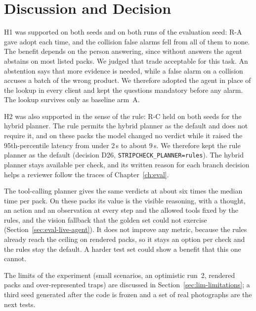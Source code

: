 \section{Discussion and Decision}
\label{sec:exp-discussion-and-decision}

H1 was supported on both seeds and on both runs of the evaluation seed: R-A gave adopt each time, and
the collision false alarms fell from all of them to none. The benefit depends on the person
answering, since without answers the agent abstains on most listed packs. We judged that trade
acceptable for this task. An abstention says that more evidence is needed, while a false alarm on a
collision accuses a batch of the wrong product. We therefore adopted the agent in place of the lookup
in every client and kept the questions mandatory before any alarm. The lookup survives only as
baseline arm~A.

H2 was also supported in the sense of the rule: R-C held on both seeds for the hybrid planner. The rule permits the hybrid
planner as the default and does not require it, and on these packs the model changed no verdict
while it raised the 95th-percentile latency from under 2\,s to about 9\,s. We therefore kept the rule
planner as the default (decision D26, \texttt{STRIPCHECK\_PLANNER=rules}). The hybrid planner stays
available per check, and its written reason for each branch decision helps a reviewer follow the
traces of Chapter~\ref{ch:eval}.

The tool-calling planner gives the same verdicts at about six times the median time per pack. On these packs its value is
the visible reasoning, with a thought, an action and an observation at every step and the allowed tools fixed by the rules, and
the vision fallback that the golden set could not exercise (Section~\ref{sec:eval-live-agent}). It does not improve any metric,
because the rules already reach the ceiling on rendered packs, so it stays an option per check and the rules stay the default. A harder
test set could show a benefit that this one cannot.

The limits of the experiment (small scenarios, an optimistic run~2, rendered packs and
over-represented traps) are discussed in Section~\ref{sec:lim-limitations}; a third seed generated
after the code is frozen and a set of real photographs are the next tests.
